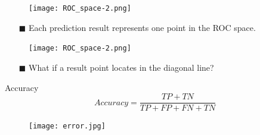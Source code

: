 \documentclass{beamer}
\begin{document}
\begin{frame}
    \vspace{-1cm}
    \begin{figure}[h]
        \centering
        \texttt{[image: ROC\_space-2.png]}    
    \end{figure}
    \vspace{-1cm}
    \begin{itemize}
        \item[$\blacksquare$] Each prediction result represents one point in the ROC space.
    \end{itemize}
\end{frame}

\begin{frame}
    \vspace{-1cm}
    \begin{figure}[h]
        \centering
        \texttt{[image: ROC\_space-2.png]}    
    \end{figure}
    \vspace{-1cm}
    \begin{itemize}
        \item[$\blacksquare$] What if a result point locates in the diagonal line?
    \end{itemize}
\end{frame}

\begin{frame}
    \begin{block}{Accuracy}
        \begin{equation}
            Accuracy=\frac{TP + TN}{TP + FP + FN + TN}
        \end{equation}
    \end{block}
    \begin{figure}[h]
        \centering
        \texttt{[image: error.jpg]}    
    \end{figure}
\end{frame}
\end{document}

